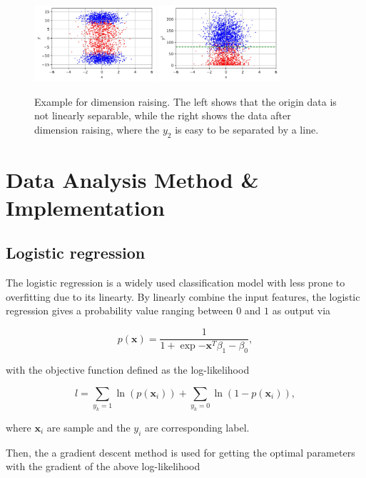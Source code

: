\documentclass[11pt]{article}
\begin{document}
\begin{figure}[H]
  \centering
  \includegraphics[width=0.4\textwidth]{./figure/Sample-Raising-1.jpg}
  \includegraphics[width=0.4\textwidth]{./figure/Sample-Raising-2.jpg}
  \caption{Example for dimension raising. The left shows that the origin data is not linearly separable, while the right shows the data after dimension raising, where the $y_2$ is easy to be separated by a line.}
  \label{sample-raising}
\end{figure}

\section{Data Analysis Method \& Implementation}

\subsection{Logistic regression}

The logistic regression is a widely used classification model with less prone to overfitting due to its linearty. By linearly combine the input features, the logistic regression gives a probability value ranging between $0$ and $1$ as output via

$$
  p (\mathbf{x}) = \frac{1}{1 + \exp{- \mathbf{x}^T \beta_1 - \beta_0}},
$$

\noindent with the objective function defined as the log-likelihood

$$
  l = \sum_{y_k = 1} \ln(p (\mathbf{x}_i)) + \sum_{y_k = 0} \ln(1 - p (\mathbf{x}_i)),
$$

\noindent where $\mathbf{x}_i$ are sample and the $y_i$ are corresponding label.

Then, the a gradient descent method is used for getting the optimal parameters with the gradient of the above log-likelihood
\end{document}

